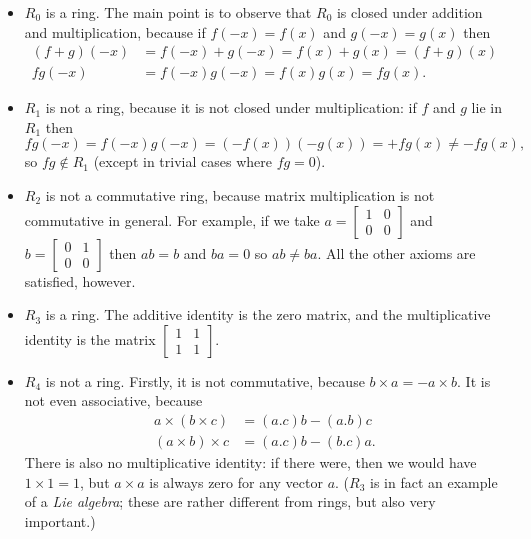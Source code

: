 \documentclass{amsart}
\newcommand{\bsm}       {\left[\begin{smallmatrix}}
\newcommand{\esm}       {\end{smallmatrix}\right]}
\newcommand{\tm}        {\times}
\renewcommand{\:}{\colon}
\theoremstyle{definition}
\renewenvironment{solution}{\SolutionAtEnd}{\endSolutionAtEnd}
\begin{document}
\begin{solution}
 \begin{itemize}
  \item $R_0$ is a ring.  The main point is to observe that $R_0$ is
   closed under addition and multiplication, because if $f(-x)=f(x)$
   and $g(-x)=g(x)$ then
   \begin{align*}
    (f+g)(-x) &= f(-x) + g(-x) = f(x) + g(x) = (f+g)(x) \\
    fg(-x) &= f(-x) g(-x) = f(x) g(x) = fg(x).
   \end{align*}
  \item $R_1$ is not a ring, because it is not closed under
   multiplication: if $f$ and $g$ lie in $R_1$ then
   \[ fg(-x)=f(-x)g(-x)=(-f(x))(-g(x))=+fg(x)\neq -fg(x), \]
   so $fg\not\in R_1$ (except in trivial cases where $fg=0$).
  \item $R_2$ is not a commutative ring, because matrix multiplication
   is not commutative in general.  For example, if we take
   $a=\bsm 1 & 0 \\ 0 & 0 \esm$ and $b=\bsm 0 & 1 \\ 0 & 0 \esm$ then
   $ab=b$ and $ba=0$ so $ab\neq ba$.  All the other axioms are
   satisfied, however.
  \item $R_3$ is a ring.  The additive identity is the zero matrix,
   and the multiplicative identity is the matrix $\bsm 1&1\\1&1\esm$.
  \item $R_4$ is not a ring.  Firstly, it is not commutative, because
   $b\tm a=-a\tm b$.  It is not even associative, because
   \begin{align*}
    a\tm (b\tm c) &= (a.c) b - (a.b) c \\
    (a\tm b)\tm c &= (a.c) b - (b.c) a.
   \end{align*}
   There is also no multiplicative identity: if there were, then we
   would have $1\tm 1=1$, but $a\tm a$ is always zero for any vector
   $a$.  ($R_3$ is in fact an example of a \emph{Lie algebra}; these
   are rather different from rings, but also very important.)
 \end{itemize}
\end{solution}
\end{document}
